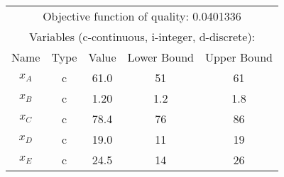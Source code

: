 \begin{tabular}{ccccc}
\hline
\multicolumn{5}{c}{Objective function of quality: 0.0401336}\\
\multicolumn{5}{c}{Variables (c-continuous, i-integer, d-discrete):} \\
\hline
Name & Type & Value & Lower Bound & Upper Bound \\
\hline \hline
$x_A$ & c & 61.0 & 51 & 61 \\
$x_B$ & c & 1.20 & 1.2 & 1.8 \\
$x_C$ & c & 78.4 & 76 & 86 \\
$x_D$ & c & 19.0 & 11 & 19 \\
$x_E$ & c & 24.5 & 14 & 26 \\
\hline
\end{tabular}